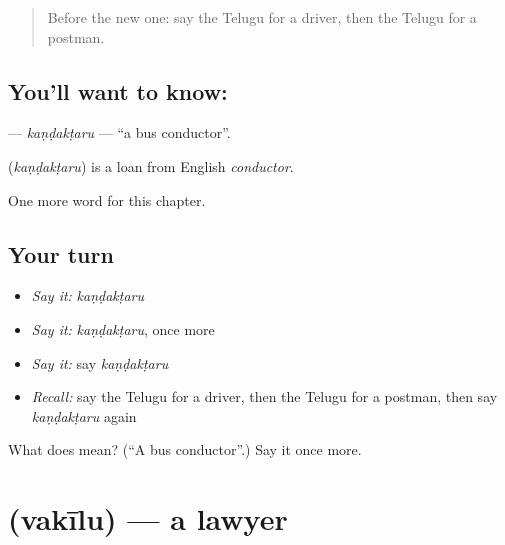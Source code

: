 \label{lesson:TE-C237-kandaktaru}



\begin{quote}
Before the new one: say the Telugu for a driver, then the Telugu for a postman.
\end{quote}

\subsection*{You'll want to know: }
\textbf{} — \emph{kaṇḍakṭaru} — \textquotedblleft{}a bus conductor\textquotedblright{}.

\begin{cousinweb}
\textbf{} (\emph{kaṇḍakṭaru}) is a loan from English \emph{conductor}.
\end{cousinweb}

\begin{grammarlens}[title={What you've built}]
One more word for this chapter.
\end{grammarlens}

\subsection*{Your turn}
\begin{itemize}
\raggedright
  \item \emph{Say it:} \emph{kaṇḍakṭaru}
  \item \emph{Say it:} \emph{kaṇḍakṭaru}, once more
  \item \emph{Say it:} say \emph{kaṇḍakṭaru}
  \item \emph{Recall:} say the Telugu for a driver, then the Telugu for a postman, then say \emph{kaṇḍakṭaru} again
\end{itemize}

\begin{tcolorbox}[breakable,colback=teal!4,colframe=teal!35!black,title={Before you move on}]
What does  mean? (\textquotedblleft{}A bus conductor\textquotedblright{}.) Say it once more.
\end{tcolorbox}
\section[\texorpdfstring{\te{వకీలు} (vakīlu)}{వకీలు (vakīlu)}]{ (vakīlu) — a lawyer}

\label{lesson:TE-C237-vakilu}



